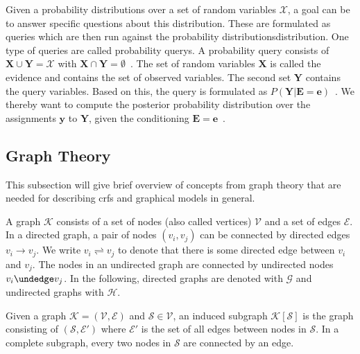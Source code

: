Given a \glspl{probability distribution} over a set of \glspl{random variable} $\mathcal{X}$, a goal can be to answer specific questions about this distribution.
These are formulated as queries which are then run against the \glspl{probability distribution}{distribution}.
One type of queries are called \glspl{probability query}.
A \gls{probability query} consists of $\mathbf{X}\cup\mathbf{Y}=\mathcal{X}$ with $\mathbf{X}\cap\mathbf{Y}=\emptyset$~\citep{koller2009probabilistic}.
The set of \glspl{random variable} $\mathbf{X}$ is called the \gls{evidence} and contains the set of observed variables.
The second set $\mathbf{Y}$ contains the query variables.
Based on this, the query is formulated as $P(\mathbf{Y}|\mathbf{E}=\mathbf{e})$~\citep{koller2009probabilistic}.
We thereby want to compute the posterior \gls{probability distribution} over the assignments $\mathbf{y}$ to $\mathbf{Y}$, given the conditioning $\mathbf{E}=\mathbf{e}$~\citep{koller2009probabilistic}.

\subsection{Graph Theory}\label{subsec:graph-theory}

This subsection will give brief overview of concepts from graph theory that are needed for describing \glspl{crf} and graphical models in general.

\bigskip

A \gls{graph} $\mathcal{K}$ consists of a set of \glspl{node} (also called vertices) $\mathcal{V}$ and a set of \glspl{edge} $\mathcal{E}$.
In a directed \gls{graph}, a pair of \glspl{node} $(v_i,v_j)$ can be connected by directed \glspl{edge} $v_i\to v_j$.
We write $v_i\rightleftharpoons v_j$ to denote that there is some directed edge between $v_i$ and $v_j$.
The \glspl{node} in an undirected graph are connected by undirected \glspl{node} $v_i\undedge v_j$.
In the following, directed \glspl{graph} are denoted with $\mathcal{G}$ and undirected \glspl{graph} with $\mathcal{H}$.

Given a \gls{graph} $\mathcal{K} = (\mathcal{V},\mathcal{E})$ and $\mathcal{S}\in\mathcal{V}$, an induced \gls{subgraph} $\mathcal{K}[\mathcal{S}]$ is the \gls{graph} consisting of $(\mathcal{S},\mathcal{E'})$ where $\mathcal{E'}$ is the set of all \glspl{edge} between \glspl{node} in $\mathcal{S}$.
In a complete \gls{subgraph}, every two \glspl{node} in $\mathcal{S}$ are connected by an \gls{edge}.


